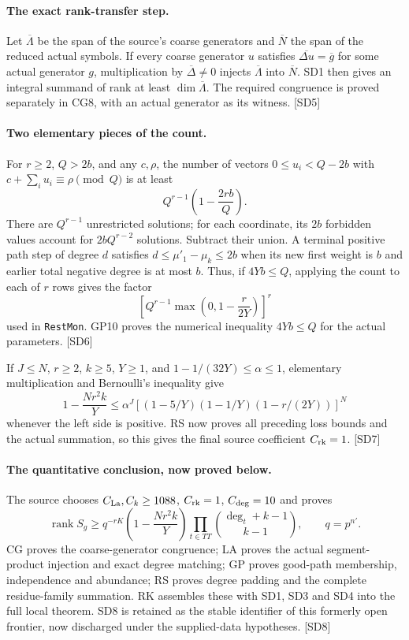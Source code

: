 \documentclass[11pt,a4paper]{article}
\numberwithin{equation}{section}
\theoremstyle{remark}\newtheorem{remark}[theorem]{Remark}
\begin{document}
\paragraph{The exact rank-transfer step.}
Let $\overline\Lambda$ be the span of the source's coarse generators and $\overline N$ the span of the reduced actual symbols. If every coarse generator $u$ satisfies $\overline{\Delta u}=\overline g$ for some actual generator $g$, multiplication by $\overline\Delta\ne0$ injects $\overline\Lambda$ into $\overline N$. SD1 then gives an integral summand of rank at least $\dim\overline\Lambda$. The required congruence is proved separately in CG8, with an actual generator as its witness. \textsf{[SD5]}

\paragraph{Two elementary pieces of the count.}
For $r\ge2$, $Q>2b$, and any $c,\rho$, the number of vectors $0\le u_i<Q-2b$ with $c+\sum_i u_i\equiv\rho\pmod Q$ is at least
\[
 Q^{r-1}\left(1-\frac{2rb}{Q}\right).
\]
There are $Q^{r-1}$ unrestricted solutions; for each coordinate, its $2b$ forbidden values account for $2bQ^{r-2}$ solutions. Subtract their union. A terminal positive path step of degree $d$ satisfies
$d\le\mu'_1-\mu_k\le2b$ when its new first weight is $b$ and earlier total negative degree is at most $b$. Thus, if $4Yb\le Q$, applying the count to each of $r$ rows gives the factor
\[
 \left[Q^{r-1}\max\!\left(0,1-\frac r{2Y}\right)\right]^r
\]
used in \texttt{RestMon}. GP10 proves the numerical inequality $4Yb\le Q$ for the actual parameters. \textsf{[SD6]}

If $J\le N$, $r\ge2$, $k\ge5$, $Y\ge1$, and $1-1/(32Y)\le\alpha\le1$, elementary multiplication and Bernoulli's inequality give
\[
 1-\frac{Nr^2k}{Y}\le
 \alpha^J\left[(1-5/Y)(1-1/Y)(1-r/(2Y))\right]^N
\]
whenever the left side is positive. RS now proves all preceding loss bounds and the actual summation, so this gives the final source coefficient $C_{\rm rk}=1$. \textsf{[SD7]}

\paragraph{The quantitative conclusion, now proved below.}
The source chooses $C_{\rm La},C_k\ge1088$, $C_{\rm rk}=1$, $C_{\rm deg}=10$ and proves
\[
 \operatorname{rank}S_g\ge q^{-rK}
 \left(1-\frac{Nr^2k}{Y}\right)
 \prod_{t\in TT}\binom{\deg_t+k-1}{k-1},\qquad q=p^{n'}.
\]
CG proves the coarse-generator congruence; LA proves the actual segment-product injection and exact degree matching; GP proves good-path membership, independence and abundance; RS proves degree padding and the complete residue-family summation. RK assembles these with SD1, SD3 and SD4 into the full local theorem. SD8 is retained as the stable identifier of this formerly open frontier, now discharged under the supplied-data hypotheses. \textsf{[SD8]}\cite{symbol-density}
\end{document}
